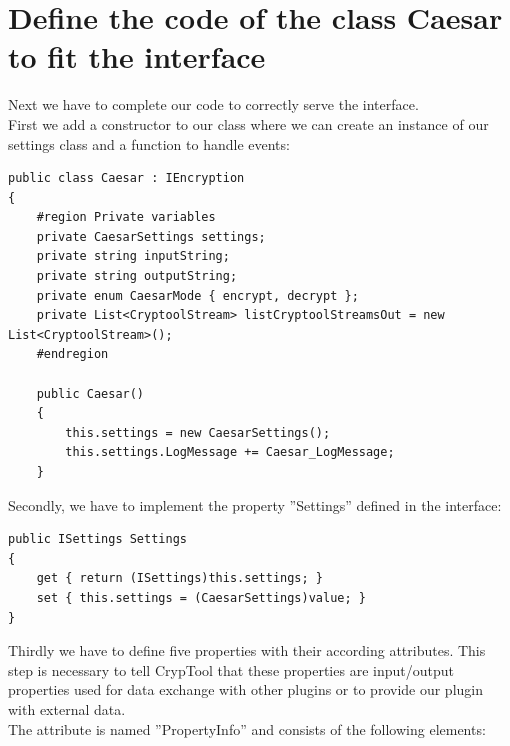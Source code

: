 \section{Define the code of the class Caesar to fit the interface}\label{sec:DefineTheCodeOfTheClassCaesarToFitTheInterface}
Next we have to complete our code to correctly serve the interface.\\
First we add a constructor to our class where we can create an instance of our settings class and a function to handle events:
\begin{lstlisting}
public class Caesar : IEncryption
{
	#region Private variables
	private CaesarSettings settings;
	private string inputString;
	private string outputString;
	private enum CaesarMode { encrypt, decrypt };
	private List<CryptoolStream> listCryptoolStreamsOut = new List<CryptoolStream>();
	#endregion
	
	public Caesar()
	{
		this.settings = new CaesarSettings();
		this.settings.LogMessage += Caesar_LogMessage;
	}
\end{lstlisting}
Secondly, we have to implement the property ''Settings'' defined in the interface:
\begin{lstlisting}
public ISettings Settings
{
	get { return (ISettings)this.settings; }
	set { this.settings = (CaesarSettings)value; }
}
\end{lstlisting}
Thirdly we have to define five properties with their according attributes. This step is necessary to tell CrypTool that these properties are input/output properties used for data exchange with other plugins or to provide our plugin with external data.\\
The attribute is named ''PropertyInfo'' and consists of the following elements:
